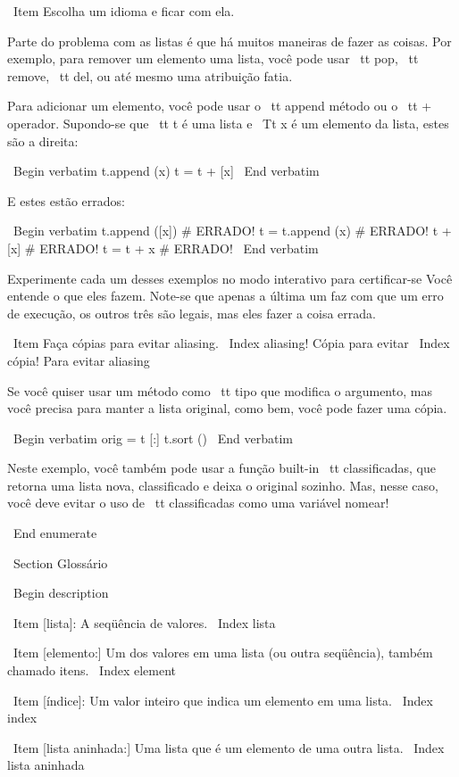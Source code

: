 \documentclass[10pt]{book}
\begin{document}
{{{{{{{\ Item Escolha um idioma e ficar com ela.

Parte do problema com as listas é que há muitos
maneiras de fazer as coisas. Por exemplo, para remover um elemento
uma lista, você pode usar {\ tt pop}, {\ tt remove}, {\ tt del},
ou até mesmo uma atribuição fatia.

Para adicionar um elemento, você pode usar o {\ tt} append método ou
o {\ tt +} operador. Supondo-se que {\ tt t} é uma lista e
{\ Tt x} é um elemento da lista, estes são a direita: 

\ Begin {verbatim}
t.append (x)
t = t + [x]
\ End {verbatim}

E estes estão errados:

\ Begin {verbatim}
t.append ([x]) # ERRADO!
t = t.append (x) # ERRADO!
t + [x] # ERRADO!
t = t + x # ERRADO!
\ End {verbatim}

Experimente cada um desses exemplos no modo interativo para certificar-se
Você entende o que eles fazem. Note-se que apenas a última
um faz com que um erro de execução, os outros três são legais, mas eles
fazer a coisa errada.


\ Item Faça cópias para evitar aliasing.
\ Index {aliasing! Cópia para evitar}
\ Index {cópia! Para evitar aliasing}

Se você quiser usar um método como {\ tt tipo} que modifica
o argumento, mas você precisa para manter a lista original, como
bem, você pode fazer uma cópia.

\ Begin {verbatim}
orig = t [:]
t.sort ()
\ End {verbatim}

Neste exemplo, você também pode usar a função built-in {\ tt classificadas},
que retorna uma lista nova, classificado e deixa o original sozinho.
Mas, nesse caso, você deve evitar o uso de {\ tt classificadas} como uma variável
nomear!

\ End {enumerate}



\ Section {} Glossário

\ Begin {description}

\ Item [lista]: A seqüência de valores.
\ Index {lista}

\ Item [elemento:] Um dos valores em uma lista (ou outra seqüência),
também chamado itens.
\ Index {element}

\ Item [índice]: Um valor inteiro que indica um elemento em uma lista.
\ Index {index}

\ Item [lista aninhada:] Uma lista que é um elemento de uma outra lista.
\ Index {lista aninhada}

}}}}}}}
\end{document}
